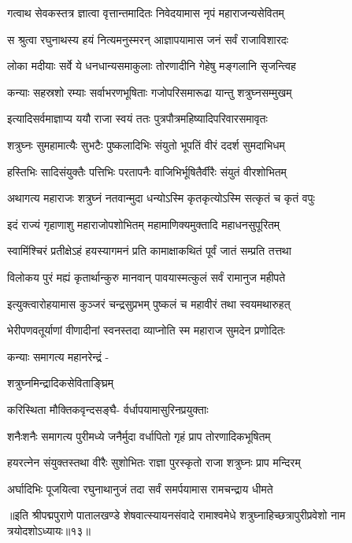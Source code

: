 \twolineshloka
{गत्वाथ सेवकस्तत्र ज्ञात्वा वृत्तान्तमादितः}
{निवेदयामास नृपं महाराजन्यसेवितम्}%

\twolineshloka
{स श्रुत्वा रघुनाथस्य हयं नित्यमनुस्मरन्}
{आज्ञापयामास जनं सर्वं राजाविशारदः}%

\twolineshloka
{लोका मदीयाः सर्वे ये धनधान्यसमाकुलाः}
{तोरणादीनि गेहेषु मङ्गलानि सृजन्त्विह}%

\twolineshloka
{कन्याः सहस्रशो रम्याः सर्वाभरणभूषिताः}
{गजोपरिसमारूढा यान्तु शत्रुघ्नसम्मुखम्}%

\twolineshloka
{इत्यादिसर्वमाज्ञाप्य ययौ राजा स्वयं ततः}
{पुत्रपौत्रमहिष्यादिपरिवारसमावृतः}%

\twolineshloka
{शत्रुघ्नः सुमहामात्यैः सुभटैः पुष्कलादिभिः}
{संयुतो भूपतिं वीरं ददर्श सुमदाभिधम्}%

\twolineshloka
{हस्तिभिः सादिसंयुक्तैः पत्तिभिः परतापनैः}
{वाजिभिर्भूषितैर्वीरैः संयुतं वीरशोभितम्}%

\twolineshloka
{अथागत्य महाराजः शत्रुघ्नं नतवान्मुदा}
{धन्योऽस्मि कृतकृत्योऽस्मि सत्कृतं च कृतं वपुः}%

\twolineshloka
{इदं राज्यं गृहाणाशु महाराजोपशोभितम्}
{महामाणिक्यमुक्तादि महाधनसुपूरितम्}%

\twolineshloka
{स्वामिंश्चिरं प्रतीक्षेऽहं हयस्यागमनं प्रति}
{कामाक्षाकथितं पूर्वं जातं सम्प्रति तत्तथा}%

\twolineshloka
{विलोकय पुरं मह्यं कृतार्थान्कुरु मानवान्}
{पावयास्मत्कुलं सर्वं रामानुज महीपते}%

\twolineshloka
{इत्युक्त्वारोहयामास कुञ्जरं चन्द्रसुप्रभम्}
{पुष्कलं च महावीरं तथा स्वयमथारुहत्}%

\twolineshloka
{भेरीपणवतूर्याणां वीणादीनां स्वनस्तदा}
{व्याप्नोति स्म महाराज सुमदेन प्रणोदितः}%

कन्याः समागत्य महानरेन्द्रं -

शत्रुघ्नमिन्द्रादिकसेविताङ्घ्रिम्

\twolineshloka
{करिस्थिता मौक्तिकवृन्दसङ्घै-}
{र्वर्धापयामासुरिनप्रयुक्ताः}%

\twolineshloka
{शनैःशनैः समागत्य पुरीमध्ये जनैर्मुदा}
{वर्धापितो गृहं प्राप तोरणादिकभूषितम्}%

\twolineshloka
{हयरत्नेन संयुक्तस्तथा वीरैः सुशोभितः}
{राज्ञा पुरस्कृतो राजा शत्रुघ्नः प्राप मन्दिरम्}%

\twolineshloka
{अर्घादिभिः पूजयित्वा रघुनाथानुजं तदा}
{सर्वं समर्पयामास रामचन्द्राय धीमते}%

॥इति श्रीपद्मपुराणे पातालखण्डे शेषवात्स्यायनसंवादे रामाश्वमेधे शत्रुघ्नाहिच्छत्रापुरीप्रवेशो नाम त्रयोदशोऽध्यायः॥१३॥

